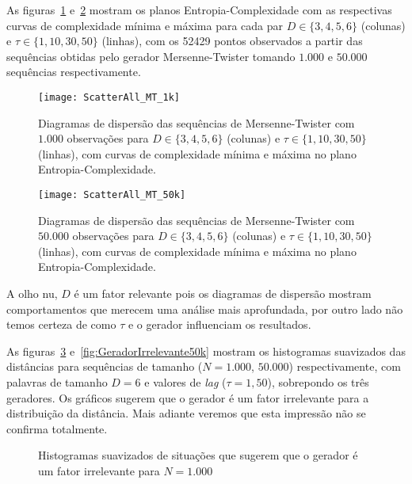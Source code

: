 As figuras~\ref{Fig:ScatterAll_MT_1k} e~\ref{Fig:ScatterAll_MT_50k} mostram os planos Entropia-Complexidade com as respectivas curvas de complexidade mínima e máxima para cada par $D\in\{3, 4, 5, 6\}$ (colunas) e $\tau\in\{1, 10, 30, 50\}$ (linhas), com os \num{52429} pontos observados a partir das sequências obtidas pelo gerador Mersenne-Twister tomando $1.000$ e $50.000$ sequências respectivamente.

\begin{figure}[hbt]
	\centering
	\texttt{[image: ScatterAll\_MT\_1k]}
	\caption{Diagramas de dispersão das sequências de Mersenne-Twister com $1.000$ observações para $D\in\{3, 4, 5, 6\}$ (colunas) e $\tau\in\{1, 10, 30, 50\}$ (linhas), com curvas de complexidade mínima e máxima no plano Entropia-Complexidade.}\label{Fig:ScatterAll_MT_1k}
\end{figure}

\begin{figure}[hbt]
	\centering
	\texttt{[image: ScatterAll\_MT\_50k]}
	\caption{Diagramas de dispersão das sequências de Mersenne-Twister com $50.000$ observações para $D\in\{3,4,5,6\}$ (colunas) e $\tau\in\{1,10,30,50\}$ (linhas), com curvas de complexidade mínima e máxima no plano Entropia-Complexidade.}\label{Fig:ScatterAll_MT_50k}
\end{figure}

A olho nu, $D$ é um fator relevante pois os diagramas de dispersão mostram comportamentos que merecem uma análise mais aprofundada, por outro lado não temos certeza de como $\tau$ e o gerador influenciam os resultados. 

As figuras~\ref{fig:GeradorIrrelevante1k} e~\ref{fig:GeradorIrrelevante50k} mostram os histogramas suavizados das distâncias para sequências de tamanho ($N=1.000$, $50.000$) respectivamente, com palavras de tamanho $D=6$  e valores de \textit{lag} ($\tau=1, 50$), sobrepondo os três geradores.
Os gráficos sugerem que o gerador é um fator irrelevante para a distribuição da distância.
Mais adiante veremos que esta impressão não se confirma totalmente.

\begin{figure} %
	\centering
		\caption{Histogramas suavizados de situações que sugerem que o gerador é um fator irrelevante para $N=1.000$}\label{fig:GeradorIrrelevante1k}
\end{figure}

